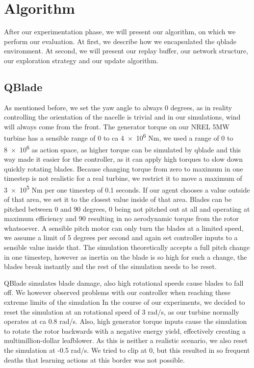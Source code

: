 \documentclass[hyperref,beleg]{cgvpub}
\begin{document}
\chapter{Algorithm}

After our experimentation phase, we will present our algorithm, on which we perform our evaluation. At first, we describe how we encapsulated the qblade environment. At second, we will present our replay buffer, our network structure, our exploration strategy and our update algorithm.

\section{QBlade}

\label{sec:alg_qblade}

As mentioned before, we set the yaw angle to always 0 degrees, as in reality controlling the orientation of the nacelle is trivial and in our simulations, wind will always come from the front. The generator torque on our NREL 5MW turbine has a sensible range of \num{0} to ca \num{4e6} Nm, we used a range of \num{0} to \num{8e6} as action space, as higher torque can be simulated by qblade and this way made it easier for the controller, as it can apply high torques to slow down quickly rotating blades.
Because changing torque from zero to maximum in one timestep is not realistic for a real turbine, we restrict it to move a maximum of \num{3e5} Nm per one timestep of 0.1 seconds. If our agent chooses a value outside of that area, we set it to the closest value inside of that area.
Blades can be pitched between 0 and 90 degrees, 0 being not pitched out at all and operating at maximum efficiency and 90 resulting in no aerodynamic torque from the rotor whatsoever. A sensible pitch motor can only turn the blades at a limited speed, we assume a limit of 5 degrees per second and again set controller inputs to a sensible value inside that. The simulation theoretically accepts a full pitch change in one timestep, however as inertia on the blade is so high for such a change, the blades break instantly and the rest of the simulation needs to be reset.

QBlade simulates blade damage, also high rotational speeds cause blades to fall off. We however observed problems with our controller when reaching these extreme limits of the simulation In the course of our experiments, we decided to reset the simulation at an rotational speed of 3 rad/s, as our turbine normally operates at ca 0.8 rad/s. Also, high generator torque inputs cause the simulation to rotate the rotor backwards with a negative energy yield, effectively creating a multimillion-dollar leafblower. As this is neither a realistic scenario, we also reset the simulation at -0.5 rad/s. We tried to clip at 0, but this resulted in so frequent deaths that learning actions at this border was not possible.
\end{document}
